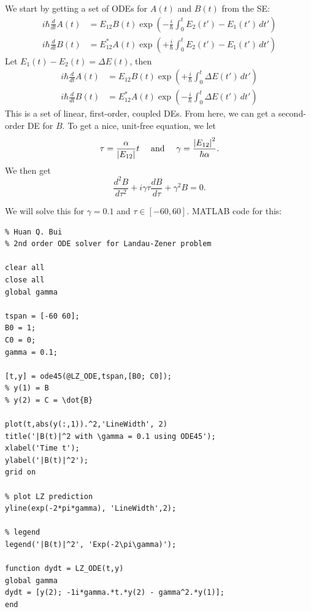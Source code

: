 \documentclass{article}
\theoremstyle{definition}
\newcommand{\al}{\alpha}
\newcommand{\f}[2]{\frac{#1}{#2}}
\newcommand{\lp}{\left(}
\newcommand{\rp}{\right)}
\begin{document}
We start by getting a set of ODEs for $A(t)$ and $B(t)$ from the SE:
\begin{align*}
i\hbar  \f{d}{dt}A(t) &= E_{12} B(t)  \exp\lp -\f{i}{\hbar} \int_0^t E_2(t') - E_1(t') \,dt'\rp\\
i\hbar  \f{d}{dt}B(t) &= E_{12}^* A(t)  \exp\lp +\f{i}{\hbar} \int_0^t E_2(t') - E_1(t') \,dt'\rp
\end{align*}
Let $E_1(t) - E_2(t) = \Delta E(t)$, then 
\begin{align*}
i\hbar  \f{d}{dt}A(t) &= E_{12} B(t)  \exp\lp +\f{i}{\hbar} \int_0^t \Delta E(t') \,dt'\rp\\
i\hbar  \f{d}{dt}B(t) &= E_{12}^* A(t)  \exp\lp -\f{i}{\hbar} \int_0^t \Delta E(t') \,dt'\rp
\end{align*}
This is a set of linear, first-order, coupled DEs. From here, we can get a second-order DE for $B$. To get a nice, unit-free equation, we let
\begin{equation*}
\tau = \f{\al}{\abs{E_{12}}} t \quad \text{ and } \quad \gamma = \f{\abs{E_{12}}^2}{\hbar \al}.
\end{equation*}
We then get
\begin{equation*}
\f{d^2 B}{d\tau^2} + i\gamma \tau \f{dB}{d\tau} + \gamma^2 B = 0.
\end{equation*}

We will solve this for $\gamma = 0.1$ and $\tau \in [-60, 60]$. MATLAB code for this: 
\begin{lstlisting}
% Huan Q. Bui
% 2nd order ODE solver for Landau-Zener problem

clear all
close all
global gamma

tspan = [-60 60];
B0 = 1;
C0 = 0;
gamma = 0.1;

[t,y] = ode45(@LZ_ODE,tspan,[B0; C0]);
% y(1) = B
% y(2) = C = \dot{B}

plot(t,abs(y(:,1)).^2,'LineWidth', 2)
title('|B(t)|^2 with \gamma = 0.1 using ODE45');
xlabel('Time t');
ylabel('|B(t)|^2');
grid on

% plot LZ prediction
yline(exp(-2*pi*gamma), 'LineWidth',2);

% legend
legend('|B(t)|^2', 'Exp(-2\pi\gamma)');

function dydt = LZ_ODE(t,y)
global gamma
dydt = [y(2); -1i*gamma.*t.*y(2) - gamma^2.*y(1)];
end

\end{lstlisting}
\end{document}
